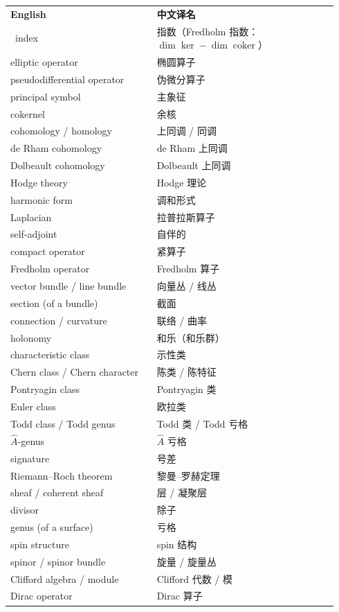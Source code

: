 \documentclass[11pt]{amsart}
\theoremstyle{definition}
\theoremstyle{remark}
\theoremstyle{plain}
\numberwithin{equation}{section}
\renewcommand{\:}{\colon}
\newcommand{\Ahat}{{\hat A}}
\DeclareMathOperator{\coker}{coker}
\begin{document}
\begin{longtable}{@{}p{0.42\linewidth}p{0.52\linewidth}@{}}
\toprule\textbf{English} & \textbf{中文译名}\\\
index & 指数（Fredholm 指数：$\dim\ker-\dim\coker$）\\
elliptic operator & 椭圆算子\\
pseudodifferential operator & 伪微分算子\\
principal symbol & 主象征\\
cokernel & 余核\\
cohomology / homology & 上同调 / 同调\\
de Rham cohomology & de Rham 上同调\\
Dolbeault cohomology & Dolbeault 上同调\\
Hodge theory & Hodge 理论\\
harmonic form & 调和形式\\
Laplacian & 拉普拉斯算子\\
self-adjoint & 自伴的\\
compact operator & 紧算子\\
Fredholm operator & Fredholm 算子\\
vector bundle / line bundle & 向量丛 / 线丛\\
section (of a bundle) & 截面\\
connection / curvature & 联络 / 曲率\\
holonomy & 和乐（和乐群）\\
characteristic class & 示性类\\
Chern class / Chern character & 陈类 / 陈特征\\
Pontryagin class & Pontryagin 类\\
Euler class & 欧拉类\\
Todd class / Todd genus & Todd 类 / Todd 亏格\\
$\Ahat$-genus & $\Ahat$ 亏格\\
signature & 号差\\
Riemann--Roch theorem & 黎曼--罗赫定理\\
sheaf / coherent sheaf & 层 / 凝聚层\\
divisor & 除子\\
genus (of a surface) & 亏格\\
spin structure & spin 结构\\
spinor / spinor bundle & 旋量 / 旋量丛\\
Clifford algebra / module & Clifford 代数 / 模\\
Dirac operator & Dirac 算子\\

\end{longtable}
\end{document}
